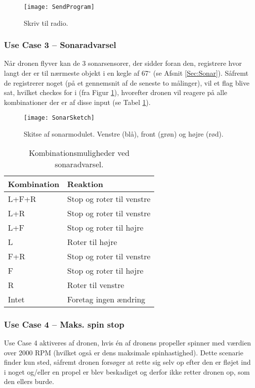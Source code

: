\documentclass[Main]{subfiles}
\begin{document}
\begin{figure}[H]
\centering
\texttt{[image: SendProgram]}
\caption{Skriv til radio.}
\label{Fig:SendProgram}
\end{figure}


\newpage
\subsubsection{Use Case 3 -- Sonaradvarsel}
Når dronen flyver kan de 3 sonarsensorer, der sidder foran den, registrere hvor langt der er til nærmeste objekt i en kegle af 67$^{\circ}$ (se Afsnit \ref{Sec:Sonar}).
Såfremt de registrerer noget (på et gennemsnit af de seneste to målinger), vil et flag blive sat, hvilket checkes for i  (fra Figur \ref{Fig:SendProgram}), hvorefter dronen vil reagere på alle kombinationer der er af disse input (se Tabel \ref{Tab:SonarAdvarse}).


\begin{figure}[H]
\centering
\texttt{[image: SonarSketch]}
\caption{Skitse af sonarmodulet. Venstre (blå), front (grøn) og højre (rød).}
\label{Fig:SonarSketch}
\end{figure}

\begin{table}[H]
\centering
	\begin{tabular}{l l}
	\hline Kombination & Reaktion
	\\ \hline 
	L+F+R & Stop og roter til venstre \\
	L+R & Stop og roter til venstre\\
	L+F & Stop og roter til højre\\
	L & Roter til højre\\
	F+R & Stop og roter til venstre\\
	F & Stop og roter til højre\\
	R & Roter til venstre\\
	Intet & Foretag ingen ændring \\ \hline
	\end{tabular}
\caption{Kombinationsmuligheder ved sonaradvarsel.}
\label{Tab:SonarAdvarse}
\end{table}

\newpage
\subsubsection{Use Case 4 -- Maks. spin stop}
Use Case 4 aktiveres af dronen, hvis én af dronens propeller spinner med værdien over 2000 RPM (hvilket også er dens maksimale spinhastighed).
Dette scenarie finder kun sted, såfremt dronen forsøger at rette sig selv op efter den er fløjet ind i noget og/eller en propel er blev beskadiget og derfor ikke retter dronen op, som den ellers burde.
\end{document}
